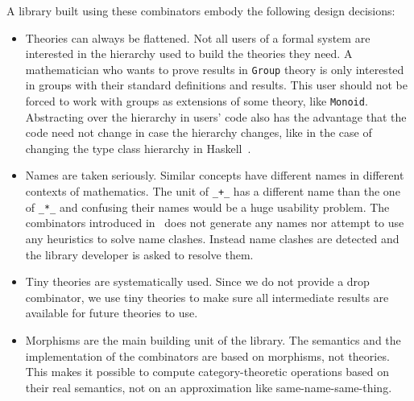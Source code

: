 A library built using these combinators embody the following design decisions:
\begin{itemize}
    \item Theories can always be flattened. Not all users of a formal system are interested in the hierarchy used to build the theories they need. A mathematician who wants to prove results in \verb|Group| theory is only interested in groups with their standard definitions and results. This user should not be forced to work with groups as extensions of some theory, like \verb|Monoid|. Abstracting over the hierarchy in users' code also has the advantage that the code need not change in case the hierarchy changes, like in the case of changing the type class hierarchy in Haskell~\cite{wiki:haskell_hierarch}. 
    \item Names are taken seriously. Similar concepts have different names in different contexts of mathematics. The unit of \verb|_+_| has a different name than the one of \verb|_*_| and confusing their names would be a huge usability problem. The combinators introduced in~\cite{carette2018building} does not generate any names nor attempt to use any heuristics to solve name clashes. Instead name clashes are detected and the library developer is asked to resolve them.  
    \item Tiny theories are systematically used. Since we do not provide a drop combinator, we use tiny theories to make sure all intermediate results are available for future theories to use. 
    \item Morphisms are the main building unit of the library. The semantics and the implementation of the combinators are based on morphisms, not theories. This makes it possible to compute category-theoretic operations based on their real semantics, not on an approximation like same-name-same-thing. 
\end{itemize}


